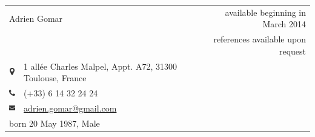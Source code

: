 \documentclass[10pt]{article}
\begin{document}
\begin{tabular}[ht]{clr}
	\multicolumn{2}{l}{\LARGE Adrien Gomar} & {\large available beginning in March 2014} \\
	& & \phantom{aaaaaaaaaaaaaaaaaaaa} {references available upon request} \\
	\includegraphics[height=9pt]{pictures/icon-map.pdf} & 1 allée Charles Malpel, Appt. A72, 31300 Toulouse, France \\
	\includegraphics[height=9pt]{pictures/icon-phone.pdf} & (+33) 6 14 32 24 24 \\
	\includegraphics[height=9pt]{pictures/icon-mail.pdf} & \href{mailto:adrien.gomar@gmail.com}{adrien.gomar@gmail.com} \\
	\multicolumn{2}{l}{born 20 May 1987, Male} & \\
\end{tabular}
\end{document}
